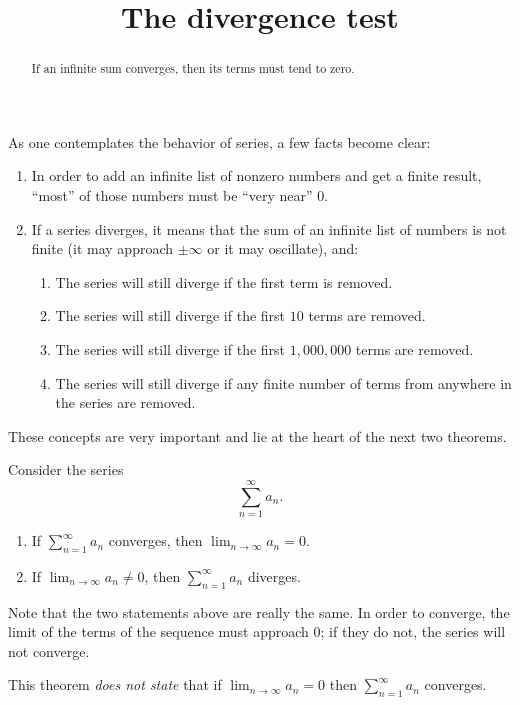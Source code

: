 \documentclass{ximera}
\title[Dig-In:]{The divergence test}
\begin{document}
\begin{abstract}
If an infinite sum converges, then its terms must tend to zero.
\end{abstract}
\maketitle


As one contemplates the behavior of series, a few facts become clear:
\begin{enumerate}
\item In order to add an infinite list of nonzero numbers and get a
  finite result, ``most'' of those numbers must be ``very near'' $0$.
\item If a series diverges, it means that the sum of an infinite list
  of numbers is not finite (it may approach $\pm \infty$ or it may
  oscillate), and:
  \begin{enumerate}
  \item The series will still diverge if the first term is removed.
  \item The series will still diverge if the first $10$ terms are
    removed.
  \item The series will still diverge if the first $1,000,000$ terms
    are removed.
  \item The series will still diverge if any finite number of terms
    from anywhere in the series are removed.
  \end{enumerate}
\end{enumerate}

These concepts are very important and lie at the heart of the next two
theorems.

\begin{theorem}
  Consider the series
  \[
  \sum_{n=1}^\infty a_n.
  \]
\begin{enumerate}
\item If $\sum_{n=1}^\infty a_n$ converges, then $\lim_{n\to\infty}a_n
  =0$.
\item If $\lim_{n\to\infty}a_n \neq 0$, then $\sum_{n=1}^\infty a_n$
  diverges.
\end{enumerate}
\end{theorem}
Note that the two statements above are really the same. In order to
converge, the limit of the terms of the sequence must approach $0$; if
they do not, the series will not converge.
\begin{warning}
  This theorem \emph{does not state} that if $\lim_{n\to\infty} a_n =
  0$ then $\sum_{n=1}^\infty a_n$ converges.
\end{warning}
\end{document}
